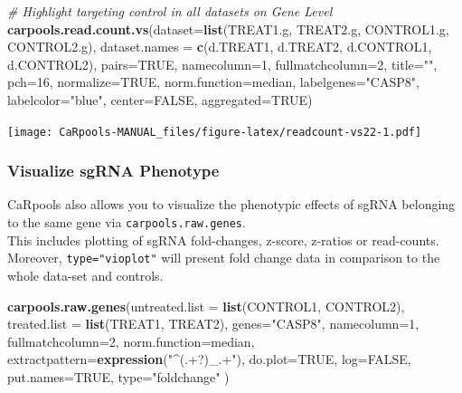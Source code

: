 \documentclass[]{article}
\newenvironment{Shaded}{\begin{snugshade}}{\end{snugshade}}
\newcommand{\KeywordTok}[1]{\textcolor[rgb]{0.13,0.29,0.53}{\textbf{{#1}}}}
\newcommand{\DataTypeTok}[1]{\textcolor[rgb]{0.13,0.29,0.53}{{#1}}}
\newcommand{\DecValTok}[1]{\textcolor[rgb]{0.00,0.00,0.81}{{#1}}}
\newcommand{\StringTok}[1]{\textcolor[rgb]{0.31,0.60,0.02}{{#1}}}
\newcommand{\CommentTok}[1]{\textcolor[rgb]{0.56,0.35,0.01}{\textit{{#1}}}}
\newcommand{\OtherTok}[1]{\textcolor[rgb]{0.56,0.35,0.01}{{#1}}}
\newcommand{\NormalTok}[1]{{#1}}
\begin{document}
\begin{Shaded}
\begin{Highlighting}[]
\CommentTok{# Highlight targeting control in all datasets on Gene Level}
\KeywordTok{carpools.read.count.vs}\NormalTok{(}\DataTypeTok{dataset=}\KeywordTok{list}\NormalTok{(TREAT1.g, TREAT2.g, CONTROL1.g, CONTROL2.g),}
  \DataTypeTok{dataset.names =} \KeywordTok{c}\NormalTok{(d.TREAT1, d.TREAT2, d.CONTROL1, d.CONTROL2), }\DataTypeTok{pairs=}\OtherTok{TRUE}\NormalTok{, }\DataTypeTok{namecolumn=}\DecValTok{1}\NormalTok{,}
  \DataTypeTok{fullmatchcolumn=}\DecValTok{2}\NormalTok{, }\DataTypeTok{title=}\StringTok{""}\NormalTok{, }\DataTypeTok{pch=}\DecValTok{16}\NormalTok{, }\DataTypeTok{normalize=}\OtherTok{TRUE}\NormalTok{, }\DataTypeTok{norm.function=}\NormalTok{median,}
  \DataTypeTok{labelgenes=}\StringTok{"CASP8"}\NormalTok{, }\DataTypeTok{labelcolor=}\StringTok{"blue"}\NormalTok{, }\DataTypeTok{center=}\OtherTok{FALSE}\NormalTok{, }\DataTypeTok{aggregated=}\OtherTok{TRUE}\NormalTok{)}
\end{Highlighting}
\end{Shaded}

\texttt{[image: CaRpools-MANUAL\_files/figure-latex/readcount-vs22-1.pdf]}

\newpage

\subsubsection{Visualize sgRNA
Phenotype}\label{visualize-sgrna-phenotype}

CaRpools also allows you to visualize the phenotypic effects of sgRNA
belonging to the same gene via \texttt{carpools.raw.genes}.\\
This includes plotting of sgRNA fold-changes, z-score, z-ratios or
read-counts. Moreover, \texttt{type="vioplot"} will present fold change
data in comparison to the whole data-set and controls.

\begin{Shaded}
\begin{Highlighting}[]
\KeywordTok{carpools.raw.genes}\NormalTok{(}\DataTypeTok{untreated.list =} \KeywordTok{list}\NormalTok{(CONTROL1, CONTROL2),}
  \DataTypeTok{treated.list =} \KeywordTok{list}\NormalTok{(TREAT1, TREAT2), }\DataTypeTok{genes=}\StringTok{"CASP8"}\NormalTok{, }\DataTypeTok{namecolumn=}\DecValTok{1}\NormalTok{,}
  \DataTypeTok{fullmatchcolumn=}\DecValTok{2}\NormalTok{, }\DataTypeTok{norm.function=}\NormalTok{median, }\DataTypeTok{extractpattern=}\KeywordTok{expression}\NormalTok{(}\StringTok{"^(.+?)_.+"}\NormalTok{), }
  \DataTypeTok{do.plot=}\OtherTok{TRUE}\NormalTok{, }\DataTypeTok{log=}\OtherTok{FALSE}\NormalTok{, }\DataTypeTok{put.names=}\OtherTok{TRUE}\NormalTok{, }\DataTypeTok{type=}\StringTok{"foldchange"} \NormalTok{)}
\end{Highlighting}
\end{Shaded}
\end{document}
